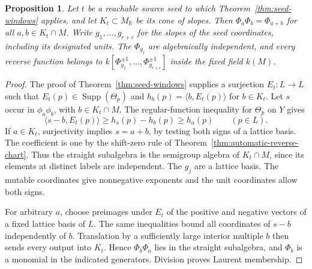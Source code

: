\documentclass[11pt,reqno]{amsart}
\numberwithin{equation}{section}
\newtheorem{proposition}[theorem]{Proposition}
\theoremstyle{definition}
\theoremstyle{remark}
\DeclareMathOperator{\Supp}{Supp}
\begin{document}
\begin{proposition}\label{prop:all-reverse-seed-cones}
Let \(t\) be a reachable source seed to which
Theorem~\ref{thm:seed-windows} applies, and let \(K_t\subset M_{\mathbb R}\)
be its cone of slopes. Then
\(\Phi_a\Phi_b=\Phi_{a+b}\) for all \(a,b\in K_t\cap M\).
Write \(g_1,\ldots,g_{r+c}\) for the slopes of the seed coordinates,
including its designated units. The \(\Phi_{g_j}\) are algebraically
independent, and every reverse function belongs to
\(k[\Phi_{g_1}^{\pm1},\ldots,\Phi_{g_{r+c}}^{\pm1}]\) inside the
fixed field \(k(M)\).
\end{proposition}
\begin{proof}
The proof of Theorem~\ref{thm:seed-windows} supplies a surjection
\(E_t:L\to L\) such that \(E_t(p)\in\Supp(\Theta_p)\) and
\(h_b(p)=\langle b,E_t(p)\rangle\) for \(b\in K_t\).
Let \(s\) occur in \(\phi_a\phi_b\), with \(b\in K_t\cap M\).
The regular-function inequality for \(\Theta_p\) on \(Y\) gives
\[ \langle s-b,E_t(p)\rangle \ge h_s(p)-h_b(p)\ge h_a(p)\qquad(p\in L). \]
If \(a\in K_t\), surjectivity implies \(s=a+b\), by testing both
signs of a lattice basis. The coefficient is one by the shift-zero
rule of Theorem~\ref{thm:automatic-reverse-chart}.
Thus the straight subalgebra is the semigroup algebra of
\(K_t\cap M\), since its elements at distinct labels are independent.
The \(g_j\) are a lattice basis. The mutable coordinates give
nonnegative exponents and the unit coordinates allow both signs.

For arbitrary \(a\), choose preimages under \(E_t\) of the
positive and negative vectors of a fixed lattice basis of \(L\).
The same inequalities bound all coordinates of \(s-b\)
independently of \(b\). Translation by a sufficiently large interior multiple
\(b\) then sends every output into \(K_t\). Hence \(\Phi_b\Phi_a\)
lies in the straight subalgebra, and \(\Phi_b\) is a monomial in
the indicated generators. Division proves Laurent membership.
\end{proof}
\end{document}
